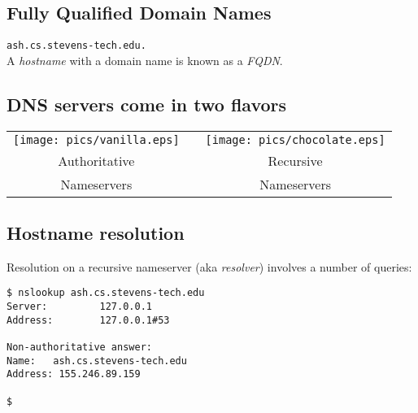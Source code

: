 \documentclass[xga]{xdvislides}
\begin{document}
\subsection{Fully Qualified Domain Names}
\vspace{.5in}
\begin{center}
	\Huge
	\verb+ash.cs.stevens-tech.edu.+ \\
	\vspace{.5in}
	A {\em hostname} with a domain name is known as a {\em FQDN}.
\end{center}
\Normalsize


\subsection{DNS servers come in two flavors}
\vspace*{\fill}
\begin{center}
	\begin{tabular}{ c c c }
	\texttt{[image: pics/vanilla.eps]} & \hspace{.5in} & \texttt{[image: pics/chocolate.eps]} \\
	\hspace{.3in} \Huge Authoritative & & \hspace{.3in} \Huge Recursive \\
	\hspace{.3in} \Huge Nameservers & & \hspace{.3in} \Huge Nameservers \\
	\end{tabular}
\end{center}
\vspace*{\fill}

\subsection{Hostname resolution}
Resolution on a recursive nameserver (aka {\em resolver}) involves a number of queries:
\vspace{.5in}
\begin{verbatim}
$ nslookup ash.cs.stevens-tech.edu
Server:         127.0.0.1
Address:        127.0.0.1#53

Non-authoritative answer:
Name:   ash.cs.stevens-tech.edu
Address: 155.246.89.159

$
\end{verbatim}
\end{document}
